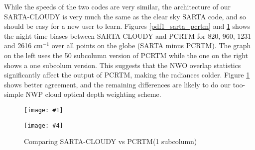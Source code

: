 \documentclass[11pt]{article}
\newcommand{\sa}{\textsf{SARTA}\xspace}
\newcommand{\sasc}{\textsf{SARTA-CLOUDY}\xspace}
\newcommand{\pcrtm}{\textsf{PCRTM}\xspace}
\newcommand{\dfigure}[6]
{
\begin{figure}
  \begin{minipage}[t]{0.47\textwidth}
  \centering
  \texttt{[image: \#1]}
   \caption{#2}  \label{#3}
  \end{minipage}
  \hfil
  \begin{minipage}[t]{0.47\linewidth}
  \centering
  \texttt{[image: \#4]}
   \caption{#5}  \label{#6}
  \end{minipage}
\end{figure}
}
\newcommand{\wn}{cm$^{-1}$\xspace}
\begin{document}




While the speeds of the two codes are very similar, the architecture
of our \sasc is very much the same as the clear sky \sa code, and so
should be easy for a new user to learn. Figures \ref{pdf1_sarta_pcrtm}
and \ref{pdf2_sarta_pcrtm} shows the night time biases between \sasc
and \pcrtm for 820, 960, 1231 and 2616 \wn over all points on the
globe (SARTA minus PCRTM). The graph on the left uses the 50 subcolumn
version of \pcrtm while the one on the right shows a one subcolum
version.  This suggests that the NWO overlap statistics significantly
affect the output of PCRTM, making the radiances colder.  Figure
\ref{pdf2_sarta_pcrtm} shows better agreement, and the remaining
differences are likely to do our too-simple NWP cloud optical depth
weighting scheme.

\dfigure{Figs/pcrtm_calc_vs_sarta_calc_histV1.jpg}{Comparing \sasc vs
  \pcrtm (50
  subcolumns)}{pdf1_sarta_pcrtm}{Figs/pcrtm_calc_vs_sarta_calc_histV2.jpg}{Comparing
  \sasc vs \pcrtm (1 subcolumn)}{pdf2_sarta_pcrtm}
\end{document}
